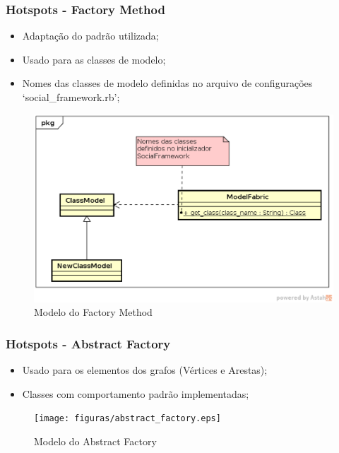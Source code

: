 \documentclass{beamer}
\begin{document}
\begin{frame}
\frametitle{Hotspots - Factory Method}

\begin{itemize}
	\item Adaptação do padrão utilizada;
	\item Usado para as classes de modelo;
	\item Nomes das classes de modelo definidas no arquivo de configurações `social\_framework.rb';
\end{itemize}

\begin{figure}[h]
	\centering
	\includegraphics[scale=0.35]{figuras/factory_method.eps}
	\caption{Modelo do Factory Method}
\end{figure}

\end{frame}

\begin{frame}
\frametitle{Hotspots - Abstract Factory}

\begin{itemize}
	\item Usado para os elementos dos grafos (Vértices e Arestas);
	\item Classes com comportamento padrão implementadas;
\end{itemize}

\begin{figure}[h]
	\centering
	\texttt{[image: figuras/abstract\_factory.eps]}
	\caption{Modelo do Abstract Factory}
\end{figure}

\end{frame}
\end{document}
